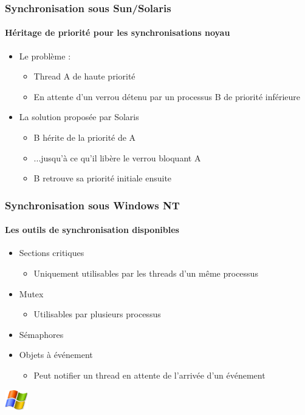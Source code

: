 \begin{frame}
\frametitle{Synchronisation sous Sun/Solaris}
\framesubtitle{Héritage de priorité pour les synchronisations noyau}
\begin{itemize}
\item <1-> Le problème :
\begin{itemize}
\item Thread A de haute priorité
\item En attente d’un verrou détenu par un processus B de priorité inférieure
\end{itemize}
\item <2-> La solution proposée par Solaris
\begin{itemize}
\item B hérite de la priorité de A
\item ...jusqu’à ce qu’il libère le verrou bloquant A
\item B retrouve sa priorité initiale ensuite
\end{itemize}
\end{itemize}
\end{frame}

\begin{frame}
\frametitle{Synchronisation sous Windows NT}
\framesubtitle{Les outils de synchronisation disponibles}
\begin{itemize}
\item <1-> Sections critiques
\begin{itemize}
\item Uniquement utilisables par les threads d’un même processus
\end{itemize}
\item <2-> Mutex
\begin{itemize}
\item Utilisables par plusieurs processus
\end{itemize}
\item <3-> Sémaphores
\item <4-> Objets à événement
\begin{itemize}
\item Peut notifier un thread en attente de l’arrivée d’un événement
\end{itemize}
\end{itemize}
\begin{flushright}
\includegraphics[width=1cm]{../illustration/logo_windows.png}
\end{flushright}
\end{frame}


